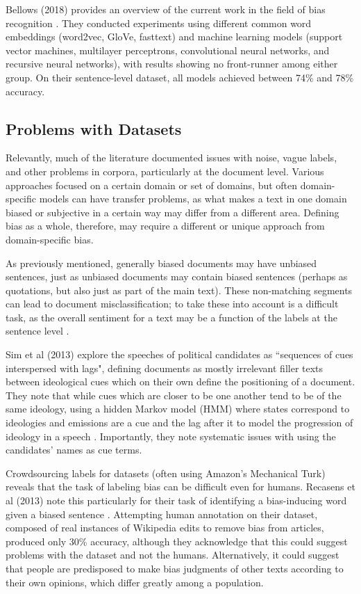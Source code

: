 \documentclass[11pt, a4paper]{article}
\begin{document}
Bellows (2018) provides an overview of the current work in the field of bias recognition \cite{bellows2018classify}. They conducted experiments using different common word embeddings (word2vec, GloVe, fasttext) and machine learning models (support vector machines, multilayer perceptrons, convolutional neural networks, and recursive neural networks), with results showing no front-runner among either group. On their sentence-level dataset, all models achieved between 74\% and 78\% accuracy.

\subsection{Problems with Datasets}

Relevantly, much of the literature documented issues with noise, vague labels, and other problems in corpora, particularly at the document level. Various approaches focused on a certain domain or set of domains, but often domain-specific models can have transfer problems, as what makes a text in one domain biased or subjective in a certain way may differ from a different area. Defining bias as a whole, therefore, may require a different or unique approach from domain-specific bias.

As previously mentioned, generally biased documents may have unbiased sentences, just as unbiased documents may contain biased sentences (perhaps as quotations, but also just as part of the main text). These non-matching segments can lead to document misclassification; to take these into account is a difficult task, as the overall sentiment for a text may be a function of the labels at the sentence level \cite{pang2008opinion}.

Sim et al (2013) explore the speeches of political candidates as ``sequences of cues interspersed with lags", defining documents as mostly irrelevant filler texts between ideological cues which on their own define the positioning of a document. They note that while cues which are closer to be one another tend to be of the same ideology, using a hidden Markov model (HMM) where states correspond to ideologies and emissions are a cue and the lag after it to model the progression of ideology in a speech \cite{sim2013measuring}. Importantly, they note systematic issues with using the candidates' names as cue terms. 

Crowdsourcing labels for datasets (often using Amazon's Mechanical Turk) reveals that the task of labeling bias can be difficult even for humans. Recasens et al (2013) note this particularly for their task of identifying a bias-inducing word given a biased sentence \cite{recasens2013linguistic}. Attempting human annotation on their dataset, composed of real instances of Wikipedia edits to remove bias from articles, produced only 30\% accuracy, although they acknowledge that this could suggest problems with the dataset and not the humans. Alternatively, it could suggest that people are predisposed to make bias judgments of other texts according to their own opinions, which differ greatly among a population.
\end{document}
